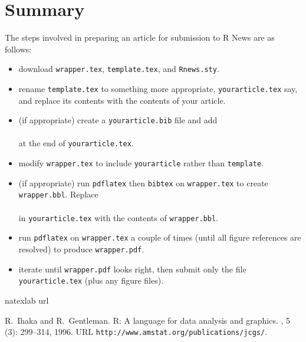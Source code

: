 \section*{Summary}

The steps involved in preparing an article for submission to R News
are as follows:

\begin{itemize}
\setlength{\itemsep}{0in}
\item download {\tt wrapper.tex}, {\tt template.tex}, and {\tt Rnews.sty}.
\item rename {\tt template.tex} to something more appropriate,
{\tt yourarticle.tex} say, and replace its
contents with the contents of your article.
\item (if appropriate) create a {\tt yourarticle.bib} file
and add \\
\verb||\\
at the end of {\tt yourarticle.tex}.  
\item modify {\tt wrapper.tex} to include {\tt yourarticle} rather
than {\tt template}.
\item (if appropriate) run {\tt pdflatex} then
 {\tt bibtex} on {\tt wrapper.tex}
to create {\tt wrapper.bbl}. Replace \\
\verb||\\
in {\tt yourarticle.tex} with
the contents of {\tt wrapper.bbl}.
\item run {\tt pdflatex} on {\tt wrapper.tex} a couple of times
(until all figure references are resolved) to produce {\tt wrapper.pdf}.
\item iterate until {\tt wrapper.pdf} looks right, then submit only 
the file {\tt yourarticle.tex} (plus any figure files). 
\end{itemize}


\begin{thebibliography}{1}
\expandafter\ifx\csname natexlab\endcsname\relax\def\natexlab#1{#1}\fi
\expandafter\ifx\csname url\endcsname\relax
  \def\url#1{{\tt #1}}\fi

R.~Ihaka and R.~Gentleman.
\newblock R: A language for data analysis and graphics.
, 5
  (3): 299--314, 1996.
\newblock URL \url{http://www.amstat.org/publications/jcgs/}.

\end{thebibliography}
